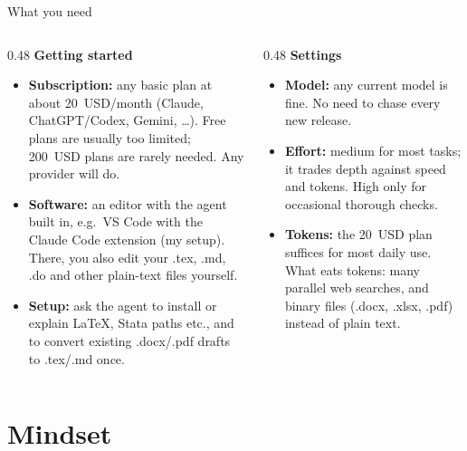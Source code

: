 \documentclass[aspectratio=169,11pt]{beamer}
\newcommand{\icon}[1]{\textcolor{accent}{#1}}
\begin{document}
\begin{frame}{What you need}
  \begin{columns}[T]
    \begin{column}{0.48\textwidth}
      \icon{\faRocket}\enspace\textbf{Getting started}
      \begin{itemize}\small
        \item \textbf{Subscription:} any basic plan at about 20~USD/month (Claude, ChatGPT/Codex, Gemini, \dots). Free plans are usually too limited; 200~USD plans are rarely needed. Any provider will do.
        \item \textbf{Software:} an editor with the agent built in, e.g.\ VS Code with the Claude Code extension (my setup). There, you also edit your .tex, .md, .do and other plain-text files yourself.
        \item \textbf{Setup:} ask the agent to install or explain LaTeX, Stata paths etc., and to convert existing .docx/.pdf drafts to .tex/.md once.
      \end{itemize}
    \end{column}
    \begin{column}{0.48\textwidth}
      \icon{\faSlidersH}\enspace\textbf{Settings}
      \begin{itemize}\small
        \item \textbf{Model:} any current model is fine. No need to chase every new release.
        \item \textbf{Effort:} medium for most tasks; it trades depth against speed and tokens. High only for occasional thorough checks.
        \item \textbf{Tokens:} the 20~USD plan suffices for most daily use. What eats tokens: many parallel web searches, and binary files (.docx, .xlsx, .pdf) instead of plain text.
      \end{itemize}
    \end{column}
  \end{columns}
\end{frame}

\section{Mindset}
\end{document}
